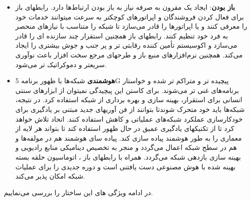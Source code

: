 \begin{itemize}
\item \textbf{باز بودن}:
ایجاد یک  مقرون به صرفه نیاز به باز بودن ارتباط‌ها دارد.
رابطهای باز برای فعال کردن فروشندگان و اپراتورهای کوچکتر به سرعت میتوانند خدمات خود را معرفی کنند و یا اپراتورها را قادر می‌سازد تا شبکه را متناسب با نیازهای منحصر به فرد خود تنظیم کنند.
رابطهای باز همچنین استقرار چند سازنده ای را قادر می‌سازد و اکوسیستم تأمین کننده رقابتی تر و پر جنب و جوش بیشتری را ایجاد می‌کند.
 همچنین نرم‌افزارهای منبع باز و طرحهای مرجع سخت افزار باعث نوآوری سریعتر و دموکراتیک تر می‌شود.
 \item \textbf{هوشمندی}
 شبکه‌ها با ظهور برنامه 5G پیچیده تر و متراکم تر شده و خواستار برنامه‌های غنی تر می‌شوند.
 برای کاستن این پیچیدگی نمیتوان از ابزارهای سنتی انسانی  برای استقرار، بهینه سازی و بهره برداری از شبکه استفاده کرد.
 در نتیجه، شبکه‌ها باید خود متحرک شوندتا بتوانند از فن آوریهای جدید مبتنی بر یادگیری برای خودکارسازی عملکرد شبکه‌های عملیاتی و کاهش  استفاده کنند.
 اتحاد  تلاش خواهد کرد تا از تکنیکهای یادگیری عمیق در حال ظهور استفاده کند تا بتواند هر لایه از معماری   را به طور هوشمند پیاده سازی کند.
 پیاده سای هوشمند هم در مولفه‌ها و هم در سطح شبکه اعمال می‌گردد و منجر به تخصیص دینامیکی منابع رادیویی و بهینه سازی بازدهی شبکه می‌گردد.
 همراه با رابطهای باز ، اتوماسیون حلقه بسته بهینه شده با هوش مصنوعی دست یافتنی است و دوره جدیدی را برای عملیات شبکه امکان پذیر می‌کند.
\end{itemize}
در ادامه ویژگی های این ساختار را بررسی می‌نماییم.
